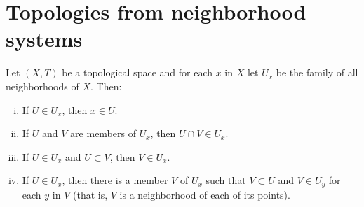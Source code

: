 \section{Topologies from neighborhood systems}

\begin{problem}
  Let $(X,T)$ be a topological space and for each $x$ in $X$ let $U_{x}$ be the
  family of all neighborhoods of $X$. Then:
  \begin{enumerate}[(i)]
    \item
      If $U\in{U_{x}}$, then $x\in{U}$.
    \item
      If $U$ and $V$ are members of $U_{x}$, then $U\cap{V}\in{U_{x}}$.
    \item
      If $U\in{U_{x}}$ and $U\subset{V}$, then $V\in{U_{x}}$.
    \item
      If $U\in{U_{x}}$, then there is a member $V$ of $U_{x}$ such that
      $V\subset{U}$ and $V\in{U_{y}}$ for each $y$ in $V$ (that is, $V$ is a
      neighborhood of each of its points).
  \end{enumerate}
\end{problem}
